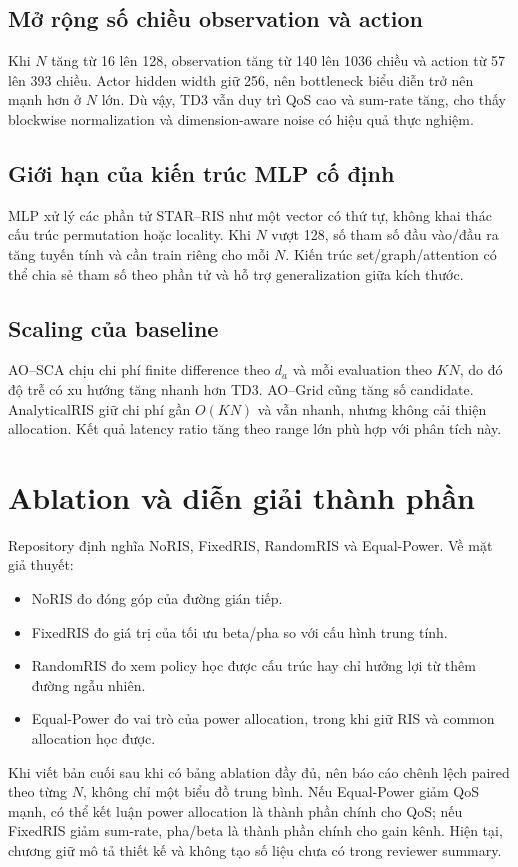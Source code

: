 \subsection{Mở rộng số chiều observation và action}
Khi $N$ tăng từ 16 lên 128, observation tăng từ 140 lên 1036 chiều và action từ 57 lên 393 chiều. Actor hidden width giữ 256, nên bottleneck biểu diễn trở nên mạnh hơn ở $N$ lớn. Dù vậy, TD3 vẫn duy trì QoS cao và sum-rate tăng, cho thấy blockwise normalization và dimension-aware noise có hiệu quả thực nghiệm.

\subsection{Giới hạn của kiến trúc MLP cố định}
MLP xử lý các phần tử STAR--RIS như một vector có thứ tự, không khai thác cấu trúc permutation hoặc locality. Khi $N$ vượt 128, số tham số đầu vào/đầu ra tăng tuyến tính và cần train riêng cho mỗi $N$. Kiến trúc set/graph/attention có thể chia sẻ tham số theo phần tử và hỗ trợ generalization giữa kích thước.

\subsection{Scaling của baseline}
AO--SCA chịu chi phí finite difference theo $d_a$ và mỗi evaluation theo $KN$, do đó độ trễ có xu hướng tăng nhanh hơn TD3. AO--Grid cũng tăng số candidate. AnalyticalRIS giữ chi phí gần $O(KN)$ và vẫn nhanh, nhưng không cải thiện allocation. Kết quả latency ratio tăng theo range lớn phù hợp với phân tích này.

\section{Ablation và diễn giải thành phần}
Repository định nghĩa NoRIS, FixedRIS, RandomRIS và Equal-Power. Về mặt giả thuyết:
\begin{itemize}
  \item NoRIS đo đóng góp của đường gián tiếp.
  \item FixedRIS đo giá trị của tối ưu beta/pha so với cấu hình trung tính.
  \item RandomRIS đo xem policy học được cấu trúc hay chỉ hưởng lợi từ thêm đường ngẫu nhiên.
  \item Equal-Power đo vai trò của power allocation, trong khi giữ RIS và common allocation học được.
\end{itemize}

Khi viết bản cuối sau khi có bảng ablation đầy đủ, nên báo cáo chênh lệch paired theo từng $N$, không chỉ một biểu đồ trung bình. Nếu Equal-Power giảm QoS mạnh, có thể kết luận power allocation là thành phần chính cho QoS; nếu FixedRIS giảm sum-rate, pha/beta là thành phần chính cho gain kênh. Hiện tại, chương giữ mô tả thiết kế và không tạo số liệu chưa có trong reviewer summary.

